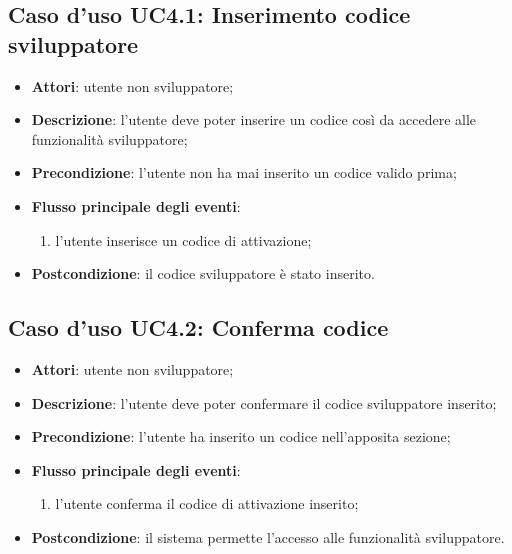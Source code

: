 \documentclass[../AnalisiDeiRequisiti.tex]{subfiles}
\begin{document}
\subsection{Caso d'uso UC4.1: Inserimento codice sviluppatore}

\begin{itemize}
\item \textbf{Attori}: utente non sviluppatore;
\item \textbf{Descrizione}: l'utente deve poter inserire un codice così da accedere alle funzionalità sviluppatore; 
      \item \textbf{Precondizione}: l'utente non ha mai inserito un codice valido prima;

        \item \textbf{Flusso principale degli eventi}:
          \begin{enumerate}
          \item l'utente inserisce un codice di attivazione;

      \end{enumerate}
    \item \textbf{Postcondizione}: il codice sviluppatore è stato inserito.
  \end{itemize}
\hypertarget{UC4.2}{}
\subsection{Caso d'uso UC4.2: Conferma codice}

\begin{itemize}
\item \textbf{Attori}: utente non sviluppatore;
\item \textbf{Descrizione}: l'utente deve poter confermare il codice sviluppatore inserito; 
      \item \textbf{Precondizione}: l'utente ha inserito un codice nell'apposita sezione;

        \item \textbf{Flusso principale degli eventi}:
          \begin{enumerate}
          \item l'utente conferma il codice di attivazione inserito;

      \end{enumerate}
    
    \item \textbf{Postcondizione}: il sistema permette l'accesso alle funzionalità sviluppatore.
  \end{itemize}
\hypertarget{UC4.3}{}
\end{document}
